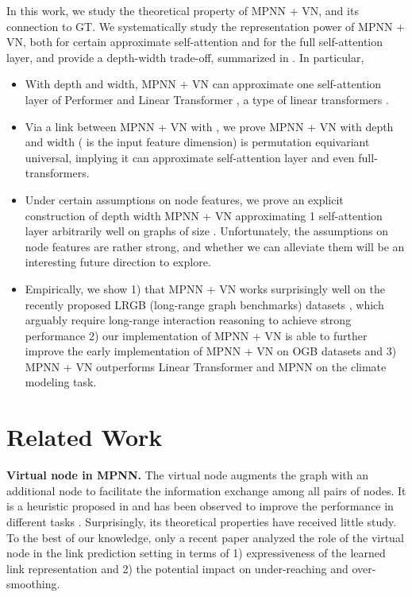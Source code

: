 \documentclass[nohyperref]{article}
\theoremstyle{plain}
\theoremstyle{definition}
\theoremstyle{remark}
\newcommand{\DS}{\text{DeepSets}}
\begin{document}
In this work, we study the theoretical property of MPNN + VN, and its connection to GT. We systematically study the representation power of MPNN + VN, both for certain approximate self-attention and for the full self-attention layer, and provide a depth-width trade-off, summarized in . In particular, 
\begin{itemize}
\item With  depth and  width, MPNN + VN can approximate one self-attention layer of Performer \citep{choromanski2020rethinking} and Linear Transformer \citep{katharopoulos2020transformers}, a type of linear transformers \citep{tay2020efficient}. \item Via a link between MPNN + VN with \DS{} \citep{zaheer2017deep}, we prove MPNN + VN with  depth and  width ( is the input feature dimension) is permutation equivariant universal, implying it can approximate self-attention layer and even full-transformers.  


\item Under certain assumptions on node features, we prove an explicit construction of  depth  width MPNN + VN approximating 1 self-attention layer arbitrarily well on graphs of size . 
Unfortunately, the assumptions on node features are rather strong, and whether we can alleviate them will be an interesting future direction to explore. 


\item Empirically, we show 1) that MPNN + VN works surprisingly well on the recently proposed LRGB (long-range graph benchmarks) datasets \citep{dwivedi2022long}, which arguably require long-range interaction reasoning to achieve strong performance 2) our implementation of MPNN + VN is able to further improve the early implementation of MPNN + VN on OGB datasets and 3) MPNN + VN outperforms Linear Transformer \citep{katharopoulos2020transformers} and MPNN on the climate modeling task. \end{itemize}


\section{Related Work}
\textbf{Virtual node in MPNN.}
The virtual node augments the graph with an additional node to facilitate the information exchange among all pairs of nodes. It is a heuristic proposed in \cite{gilmer2017neural} and has been observed to improve the performance in different tasks \citep{hu2021ogb,hu2020open}. Surprisingly, its theoretical properties have received little study. To the best of our knowledge, only a recent paper \citep{hwanganalysis} analyzed the role of the virtual node in the link prediction setting in terms of 1) expressiveness
of the learned link representation and 2) the potential impact on under-reaching and over-smoothing. 
\end{document}
